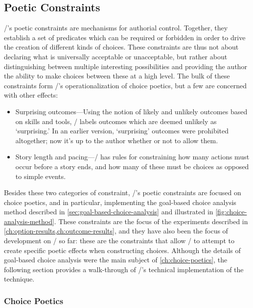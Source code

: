 \subsection{Poetic Constraints}
\label{sec:dunyazad-poetic-constraints}%

\dunyazad/'s poetic constraints are mechanisms for authorial control.
%
Together, they establish a set of predicates which can be required or forbidden in order to drive the creation of different kinds of choices.
%
These constraints are thus not about declaring what is universally acceptable or unacceptable, but rather about distinguishing between multiple interesting possibilities and providing the author the ability to make choices between these at a high level.
%
The bulk of these constraints form \dunyazad/'s operationalization of choice poetics, but a few are concerned with other effects:
%
\begin{itemize}
  \item Surprising outcomes---Using the notion of likely and unlikely outcomes based on skills and tools, \dunyazad/ labels outcomes which are deemed unlikely as `surprising.' In an earlier version, `surprising' outcomes were prohibited altogether; now it's up to the author whether or not to allow them.
  \item Story length and pacing---\dunyazad/ has rules for constraining how many actions must occur before a story ends, and how many of these must be choices as opposed to simple events.
\end{itemize}
%
Besides these two categories of constraint, \dunyazad/'s poetic constraints are focused on choice poetics, and in particular, implementing the goal-based choice analysis method described in \cref{sec:goal-based-choice-analysis} and illustrated in \cref{fig:choice-analysis-method}.
%
These constraints are the focus of the experiments described in \cref{ch:option-results,ch:outcome-results}, and they have also been the focus of development on \dunyazad/ so far: these are the constraints that allow \dunyazad/ to attempt to create specific poetic effects when constructing choices.
%
Although the details of goal-based choice analysis were the main subject of \cref{ch:choice-poetics}, the following section provides a walk-through of \dunyazad/'s technical implementation of the technique.

\subsubsection{Choice Poetics}

